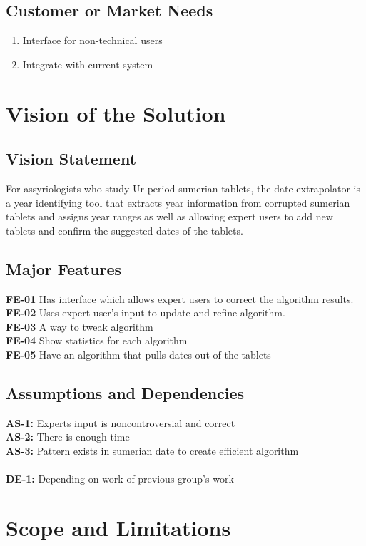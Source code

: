 \documentclass[11pt]{article}
\begin{document}
\subsection{Customer or Market Needs}
\begin{enumerate}
    \item Interface for non-technical users
    \item Integrate with current system
\end{enumerate}

\section{Vision of the Solution}
\subsection{Vision Statement}
For assyriologists who study Ur period sumerian tablets, the date extrapolator is a year identifying tool that extracts year information from corrupted sumerian tablets and assigns year ranges as well as allowing expert users to add new tablets and confirm the suggested dates of the tablets.
\subsection{Major Features}
\textbf{FE-01} Has interface which allows expert users to correct the algorithm results.\\
\textbf{FE-02} Uses expert user’s input to update and refine algorithm.\\
\textbf{FE-03} A way to tweak algorithm \\
\textbf{FE-04} Show statistics for each algorithm\\
\textbf{FE-05} Have an algorithm that pulls dates out of the tablets
\subsection{Assumptions and Dependencies}
\textbf{AS-1:} Experts input is noncontroversial and correct \\
\textbf{AS-2:} There is enough time \\
\textbf{AS-3:} Pattern exists in sumerian date to create efficient algorithm \\
 \\
 \textbf{DE-1:} Depending on work of previous group’s work \\

\section{Scope and Limitations}
\end{document}
